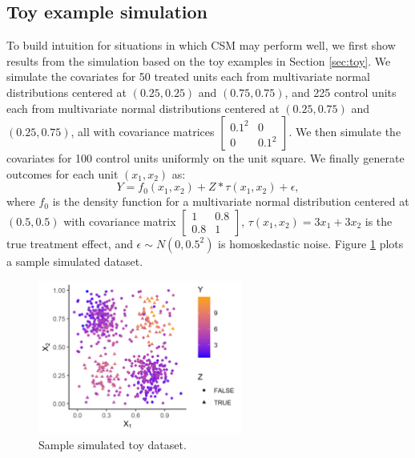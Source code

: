 \documentclass{article}
\begin{document}
\subsection{Toy example simulation}

To build intuition for situations in which CSM may perform well, we first show results from the simulation based on the toy examples in Section \ref{sec:toy}.
We simulate the covariates for 50 treated units each from multivariate normal distributions centered at $(0.25, 0.25)$ and $(0.75, 0.75)$, and 225 control units each from multivariate normal distributions centered at $(0.25, 0.75)$ and $(0.25, 0.75)$, all with covariance matrices $\begin{bmatrix} 0.1^2 & 0 \\ 0 & 0.1^2 \end{bmatrix}$.
We then simulate the covariates for 100 control units uniformly on the unit square.
We finally generate outcomes for each unit $(x_1, x_2)$ as:
$$Y = f_0(x_1, x_2) + Z*\tau(x_1, x_2) + \epsilon,$$
where $f_0$ is the density function for a multivariate normal distribution centered at $(0.5, 0.5)$ with covariance matrix $\begin{bmatrix} 1 & 0.8 \\ 0.8 & 1 \end{bmatrix}$, 
$\tau(x_1, x_2) = 3x_1 + 3x_2$ is the true treatment effect, 
and $\epsilon \sim N(0, 0.5^2)$ is homoskedastic noise.
Figure \ref{fig:sim_toy_ex} plots a sample simulated dataset.
\begin{figure}[t]
    \centering
    \includegraphics[width=0.6\textwidth]{writeup/figures/sim_toy_ex.png}
    \caption{Sample simulated toy dataset.}
    \label{fig:sim_toy_ex}
\end{figure}
\end{document}
